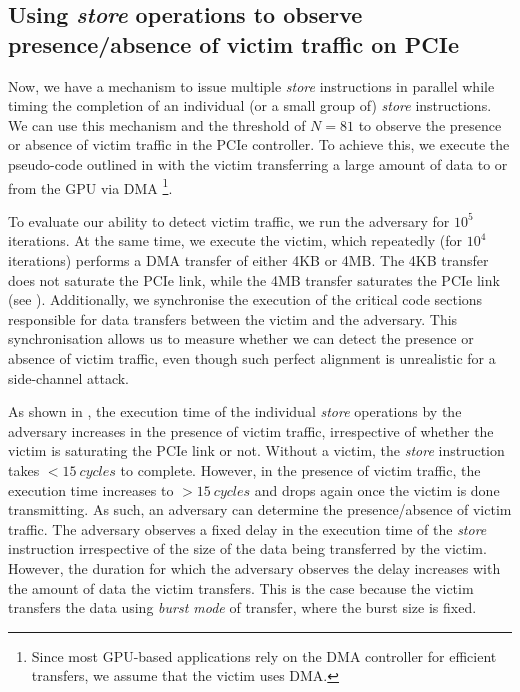 \subsection{Using \textit{store} operations to observe presence/absence of victim traffic on PCIe}
\label{subsec:interconnect-sc-store-ops-measuring-time}
Now, we have a mechanism to issue multiple \textit{store} instructions in parallel while timing the completion of an individual (or a small group of) \textit{store} instructions.
We can use this mechanism and the threshold of $N = 81$ to observe the presence or absence of victim traffic in the PCIe controller.
To achieve this, we execute the pseudo-code outlined in  with the victim transferring a large amount of data to or from the GPU via DMA
\footnote{Since most GPU-based applications rely on the DMA controller for efficient transfers, we assume that the victim uses DMA.}.

To evaluate our ability to detect victim traffic, we run the adversary for $10^5$ iterations.
At the same time, we execute the victim, which repeatedly (for $10^4$ iterations) performs a DMA transfer of either 4KB or 4MB.
The 4KB transfer does not saturate the PCIe link, while the 4MB transfer saturates the PCIe link (see ).
Additionally, we synchronise the execution of the critical code sections responsible for data transfers between the victim and the adversary. 
This synchronisation allows us to measure whether we can detect the presence or absence of victim traffic, even though such perfect alignment is unrealistic for a side-channel attack.

As shown in , the execution time of the individual \textit{store} operations by the adversary increases in the presence of victim traffic, irrespective of whether the victim is saturating the PCIe link or not.
Without a victim, the \textit{store} instruction takes $<15~cycles$ to complete. However, in the presence of victim traffic, the execution time increases to $>15~cycles$ and drops again once the victim is done transmitting.
As such, an adversary can determine the presence/absence of victim traffic.
The adversary observes a fixed delay in the execution time of the \textit{store} instruction irrespective of the size of the data being transferred by the victim.
However, the duration for which the adversary observes the delay increases with the amount of data the victim transfers.
This is the case because the victim transfers the data using \textit{burst mode} of transfer, where the burst size is fixed.


